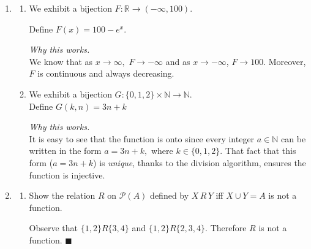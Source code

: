 \documentclass[11pt]{article}
\newcommand{\R}{{\mathbb{R}}}
\newcommand{\N}{{\mathbb{N}}}
\begin{document}
\begin{enumerate}
Observe that 8 is best possible since the set $S$ itself demonstrates that there exist sets of cardinality $7$ such that all elements have different remainders.  $\blacksquare$


\item %

\begin{enumerate}

\item We exhibit a bijection $F: \R \to (-\infty, 100)$.

\medskip
Define $F(x) = 100 - e^{x}$.

\medskip
\textit{Why this works.}\\
We know that as $x \to \infty,$ $F \to -\infty$ and as $x \to -\infty$, $F \to 100.$ Moreover, $F$ is continuous and always decreasing.

\medskip

\item We exhibit a bijection $G: \{0,1,2\}\times\N \to \N.$\\

Define $G(k, n) = 3n + k$

\medskip
\textit{Why this works.}\\
It is easy to see that the function is onto since every integer $a \in \N$ can be written in the form $a=3n+k,$ where $k \in \{0,1,2\}.$ That fact that this form ($a=3n+k$) is \emph{unique}, thanks to the division algorithm, ensures the function is injective.

\end{enumerate}

\item %

\begin{enumerate}

\item Show the relation $R$ on $\mathcal{P}(A)$ defined by $X\,R\,Y$ iff $X\cup Y=A$ is not a function.

\medskip
Observe that $\{1,2\} R \{3,4\}$ and $\{1,2\} R \{2, 3,4\}$. 
Therefore $R$ is not a function. $\blacksquare$


\end{enumerate}
\end{enumerate}
\end{document}
